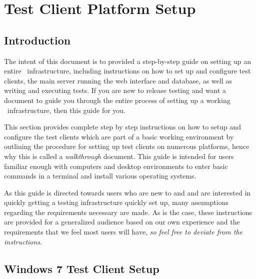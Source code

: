 \chapter{\cernvmreleasetesting Test Client Platform Setup}
\label{sec:testclientsetup}

\section{Introduction}
The intent of this document is to provided a step-by-step guide on setting up an entire \cernvmreleasetesting\ infrastructure, including instructions
on how to set up and configure test clients, the main server running the web interface and database, as well as writing and executing tests. If you are
new to release testing and want a document to guide you through the entire process of setting up a working \cernvmreleasetesting\ infrastructure,
then this guide for you.

This section provides complete step by step instructions on how to setup and configure the test clients which are part of a basic working
\releasetesting environment by outlining the procedure for setting up test clients on numerous platforms, hence why this is called a 
\emph{walkthrough} document. This guide is intended for users familiar enough with computers and desktop environments to enter basic commands
in a terminal and install various operating systems. 

As this guide is directed towards users who are new to \cernvmreleasetesting and \tapper and
are interested in quickly getting a \cernvm testing infrastructure quickly set up, many assumptions regarding the requirements necessary are made.
As is the case, these instructions are provided for a generalized audience based on our own experience and the requirements that we feel most users
will have, \emph{so feel free to deviate from the instructions}. 

\section{Windows 7 Test Client Setup}

